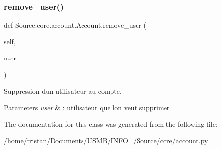 \subsubsection{\texorpdfstring{remove\+\_\+user()}{remove\_user()}}
{\footnotesize\ttfamily def Source.\+core.\+account.\+Account.\+remove\+\_\+user (\begin{DoxyParamCaption}\item[{}]{self,  }\item[{}]{user }\end{DoxyParamCaption})}



Suppression d\textquotesingle{}un utilisateur au compte. 


\begin{DoxyParams}{Parameters}
{\em user} & \+: utilisateur que l\textquotesingle{}on veut supprimer \\
\hline
\end{DoxyParams}


The documentation for this class was generated from the following file\+:\begin{DoxyCompactItemize}
\item 
/home/tristan/\+Documents/\+U\+S\+M\+B/\+I\+N\+F\+O\+\_/\+Source/core/account.\+py\end{DoxyCompactItemize}
